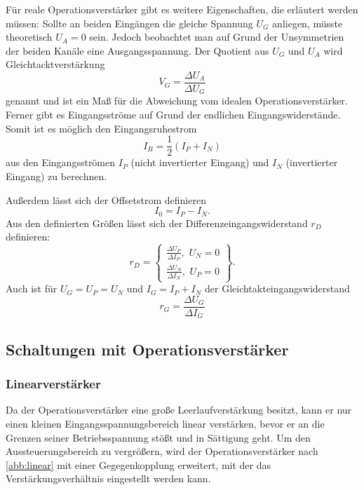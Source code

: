 Für reale Operationsverstärker gibt es weitere Eigenschaften, die erläutert werden müssen:
Sollte an beiden Eingängen die gleiche Spannung $U_G$ anliegen, müsste theoretisch $U_A = 0$ sein. Jedoch beobachtet man auf Grund der Unsymmetrien der beiden Kanäle eine Ausgangsspannung.
Der Quotient aus $U_G$ und $U_A$ wird Gleichtacktverstärkung
\begin{equation}
V_G = \frac{\Delta U_A}{\Delta U_G}
\end{equation}
genannt und ist ein Maß für die Abweichung vom idealen Operationsverstärker.
Ferner gibt es Eingangsströme auf Grund der endlichen Eingangswiderstände. Somit ist es möglich den Eingangsruhestrom
\begin{equation}
I_B = \frac{1}{2} (I_P + I_N)
\end{equation}
aus den Eingangsströmen $I_P$ (nicht invertierter Eingang) und $I_N$ (invertierter Eingang) zu berechnen.

\noindent Außerdem lässt sich der Offsetstrom definieren
\begin{equation}
I_0 = I_P - I_N.
\end{equation}
Aus den definierten Größen lässt sich der Differenzeingangswiderstand $r_D$ definieren:
\begin{equation}
r_D = \left\{\begin{array}{ll} \frac{\Delta U_P}{\Delta I_P}, \, \, U_N = 0\\
	  \frac{\Delta U_N}{\Delta I_N}, \, \, U_P = 0\end{array}\right\}.
\end{equation}
Auch ist für $U_G = U_P = U_N$ und $I_G = I_P + I_N$ der Gleichtakteingangswiderstand
\begin{equation}
r_G = \frac{\Delta U_G}{\Delta I_G}
\end{equation}

\subsection{Schaltungen mit Operationsverst{\"a}rker}

\subsubsection{Linearverst{\"a}rker}
Da der Operationsverstärker eine große Leerlaufverstärkung besitzt, kann  er nur einen kleinen Eingangsspannungsbereich linear verstärken, bevor er an die Grenzen  seiner Betriebsspannung stößt und in Sättigung geht. Um den Aussteuerungsbereich zu vergrößern, wird der Operationsverstärker nach \autoref{abb:linear} mit einer Gegegenkopplung erweitert, mit der das Verstärkungsverhältnis eingestellt werden kann.

